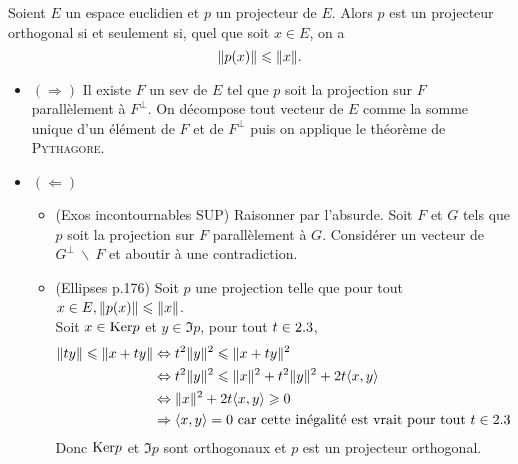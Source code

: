 \begin{tcolorbox}
    Soient $E$ un espace euclidien et $p$ un projecteur de $E$. Alors $p$ est un projecteur orthogonal si et seulement si, quel que soit $x \in E$, on a
    $$\Vert p(x) \Vert \leqslant \Vert x \Vert.$$
\end{tcolorbox}

\begin{preuve}
    \begin{itemize}
        \item $(\Rightarrow)$ Il existe $F$ un sev de $E$ tel que $p$ soit la projection sur $F$ parallèlement à $F^\perp$. On décompose tout vecteur de $E$ comme la somme unique d'un élément de $F$ et de $F^\perp$ puis on applique le théorème de \textsc{Pythagore}. 
        \item $(\Leftarrow)$ 
        \begin{itemize}
            \item (Exos incontournables SUP) Raisonner par l'absurde. Soit $F$ et $G$ tels que $p$ soit la projection sur $F$ parallèlement à $G$. Considérer un vecteur de $G^\perp\ \backslash\ F$ et aboutir à une contradiction.
            \item (Ellipses p.176) Soit $p$ une projection telle que pour tout $x \in E, \Vert p(x) \Vert \leqslant \Vert x \Vert$. \\
            Soit $x \in \mathrm{Ker} p$ et $y \in \Im p$, pour tout $t \in 2.3$, 
            \begin{align*}
                \Vert ty \Vert \leqslant \Vert x + ty \Vert &\Leftrightarrow t^2 \Vert y \Vert^2 \leqslant \Vert x+ty \Vert^2 \\
                &\Leftrightarrow t^2 \Vert y \Vert^2 \leqslant \Vert x \Vert^2 + t^2 \Vert y \Vert^2 + 2t \langle x, y \rangle \\
                &\Leftrightarrow \Vert x \Vert^2 + 2t \langle x, y \rangle \geqslant 0 \\
                &\Rightarrow \langle x, y \rangle = 0 \text{ car cette inégalité est vrait pour tout } t \in 2.3
            \end{align*}
            Donc $\mathrm{Ker} p$ et $\Im p$ sont orthogonaux et $p$ est un projecteur orthogonal.
        \end{itemize}
    \end{itemize}
\end{preuve}
